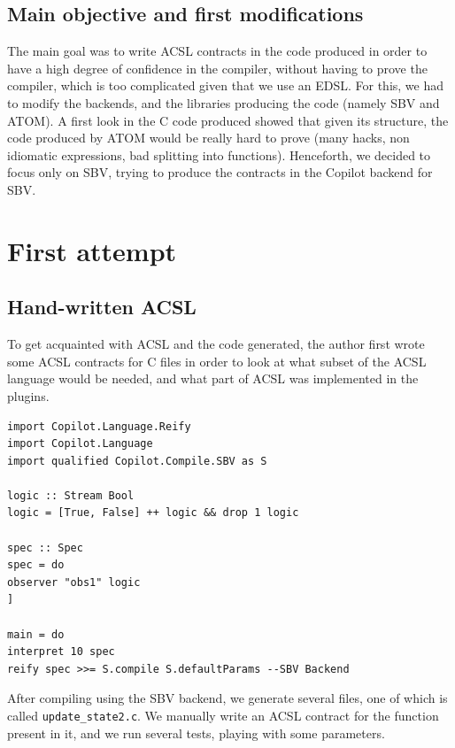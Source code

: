 \documentclass[a4paper,11pt,final]{article}
\begin{document}
	\subsection{Main objective and first modifications}
	The main goal was to write ACSL contracts in the code produced in order to have a high degree of confidence in the compiler, without having to prove the compiler, which is too complicated given that we use an EDSL. For this, we had to modify the backends, and the libraries producing the code (namely SBV and ATOM). A first look in the C code produced showed that given its structure, the code produced by ATOM would be really hard to prove (many hacks, non idiomatic expressions, bad splitting into functions). Henceforth, we decided to focus only on SBV, trying to produce the contracts in the Copilot backend for SBV.
	
	\section{First attempt}
	\subsection{Hand-written ACSL}
	
	To get acquainted with ACSL and the code generated, the author first wrote some ACSL contracts for C files in order to look at what subset of the ACSL language would be needed, and what part of ACSL was implemented in the plugins.
	
\begin{verbatim}
import Copilot.Language.Reify
import Copilot.Language
import qualified Copilot.Compile.SBV as S

logic :: Stream Bool
logic = [True, False] ++ logic && drop 1 logic

spec :: Spec
spec = do
observer "obs1" logic
]

main = do
interpret 10 spec
reify spec >>= S.compile S.defaultParams --SBV Backend

\end{verbatim}
	
	After compiling using the SBV backend, we generate several files, one of which is called \texttt{update\_state2.c}. We manually write an ACSL contract for the function present in it, and we run several tests, playing with some parameters.
	
\end{document}
